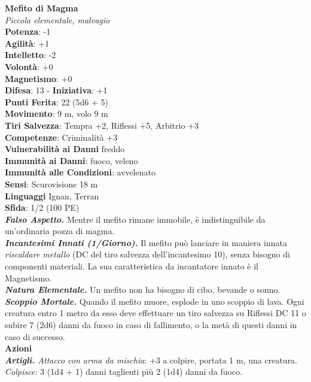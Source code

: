 \begin{multicols}{2}
\medskip\textbf{Mefito di Magma}\\
\emph{Piccola elementale, malvagio}\\
\textbf{Potenza}: -1\\
\textbf{Agilità}: +1\\
\textbf{Intelletto}: -2\\
\textbf{Volontà}: +0\\
\textbf{Magnetismo}: +0\\
\textbf{Difesa}: 13 - \textbf{Iniziativa}: +1\\
\textbf{Punti Ferita}: 22 (5d6 + 5)\\
\textbf{Movimento}: 9 m, volo 9 m\\
\textbf{Tiri Salvezza}: Tempra +2, Riflessi +5, Arbitrio +3\\
\textbf{Competenze}: Criminalità +3\\
\textbf{Vulnerabilità ai Danni} freddo\\
\textbf{Immunità ai Danni}: fuoco, veleno\\
\textbf{Immunità alle Condizioni}: avvelenato\\
\textbf{Sensi}: Scurovisione 18 m\\
\textbf{Linguaggi} Ignan, Terran\\
\textbf{Sfida}: 1/2 (100 PE)\smallskip\\
\emph{\textbf{Falso Aspetto.}} Mentre il mefito rimane immobile, è indistinguibile da un'ordinaria pozza di magma.\\
\emph{\textbf{Incantesimi Innati (1/Giorno).}} Il mefito può lanciare in maniera innata \emph{riscaldare metallo} (DC del tiro salvezza dell'incantesimo 10), senza bisogno di componenti materiali. La sua caratteristica da incantatore innato è il Magnetismo.\\
\emph{\textbf{Natura Elementale.}} Un mefito non ha bisogno di cibo, bevande o sonno.\\
\emph{\textbf{Scoppio Mortale.}} Quando il mefito muore, esplode in uno scoppio di lava. Ogni creatura entro 1 metro da esso deve effettuare un tiro salvezza su Riflessi DC 11 o subire 7 (2d6) danni da fuoco in caso di fallimento, o la metà di questi danni in caso di successo.\\
\smallskip\textbf{Azioni}\\
\emph{\textbf{Artigli.} Attacco con arma da mischia}: +3 a colpire, portata 1 m, una creatura.\\
\emph{Colpisce:} 3 (1d4 + 1) danni taglienti più 2 (1d4) danni da fuoco.\\

\end{multicols}
